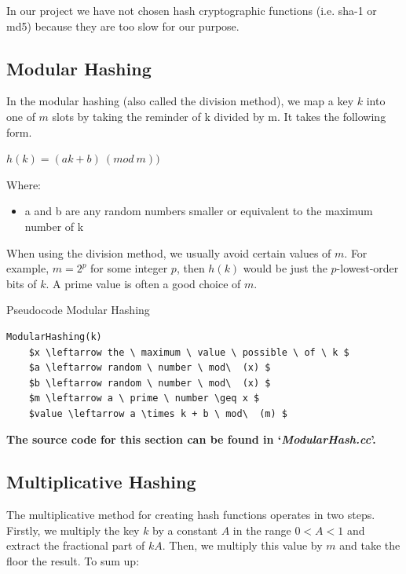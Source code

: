 \documentclass[12pt]{article}
\begin{document}
{In our project we have not chosen hash cryptographic functions (i.e. sha-1 or md5) because they are too slow for our purpose.

\subsection{Modular Hashing}

In the modular hashing (also called the division method), we map a key $k$ into one of $m$ slots by taking the reminder of k divided by m. It takes the following form. 

\begin{center} $h(k) = (ak+b)\  (mod \ m))$ \end{center}

Where: 
\begin{itemize}
\item a and b are any random numbers smaller or equivalent to the maximum number of k 
\end{itemize}

When using the division method, we usually avoid certain values of $m$. For example, $m = 2^p$ for some integer $p$, then $h(k)$ would be just the $p$-lowest-order bits of $k$. A prime value is often a good choice of $m$.

\begin{center}
\begin{large}
Pseudocode Modular Hashing
\end{large}
\end{center}

\begin{lstlisting}[mathescape=true]
ModularHashing(k)
	$x \leftarrow the \ maximum \ value \ possible \ of \ k $
	$a \leftarrow random \ number \ mod\  (x) $
	$b \leftarrow random \ number \ mod\  (x) $
	$m \leftarrow a \ prime \ number \geq x $
	$value \leftarrow a \times k + b \ mod\  (m) $

\end{lstlisting}

\textbf{The source code for this section can be found in `\textit{ModularHash.cc}'.}
\bigskip

\subsection{Multiplicative Hashing}
The multiplicative method for creating hash functions operates in two steps.
Firstly, we multiply the key $k$ by a constant $A$ in the range $0<A<1$ and extract the fractional part of $kA$. Then, we multiply this value by $m$ and take the floor the result. To sum up:  

}
\end{document}

